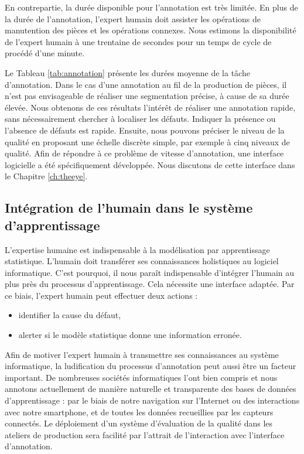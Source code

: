 En contrepartie, la durée disponible pour l'annotation est très limitée. En plus de la durée de l'annotation, l'expert humain doit assister les opérations de manutention des pièces et les opérations connexes.
Nous estimons la disponibilité de l'expert humain à une trentaine de secondes pour un temps de cycle de procédé d'une minute.

Le Tableau \ref{tab:annotation} présente les durées moyenne de la tâche d'annotation.
Dans le cas d'une annotation au fil de la production de pièces, il n'est pas envisageable de réaliser une segmentation précise, à cause de sa durée élevée.
Nous obtenons de ces résultats l'intérêt de réaliser une annotation rapide, sans nécessairement chercher à localiser les défauts.
Indiquer la présence ou l'absence de défauts est rapide.
Ensuite, nous pouvons préciser le niveau de la qualité en proposant une échelle discrète simple, par exemple à cinq niveaux de qualité.
Afin de répondre à ce problème de vitesse d'annotation, une interface logicielle a été spécifiquement développée.
Nous discutons de cette interface dans le Chapitre \ref{ch:theeye}.

\subsection{Intégration de l'humain dans le système d'apprentissage}
L'expertise humaine est indispensable à la modélisation par apprentissage statistique.
L'humain doit transférer ses connaissances holistiques au logiciel informatique.
C'est pourquoi, il nous paraît indispensable d'intégrer l'humain au plus près du processus d'apprentissage.
Cela nécessite une interface adaptée.
Par ce biais, l'expert humain peut effectuer deux actions :
\begin{itemize}
    \item identifier la cause du défaut,
    \item alerter si le modèle statistique donne une information erronée.
\end{itemize}

Afin de motiver l'expert humain à transmettre ses connaissances au système informatique, la ludification du processus d'annotation peut aussi être un facteur important.
De nombreuses sociétés informatiques l'ont bien compris et nous annotons actuellement de manière naturelle et transparente des bases de données d'apprentissage : par le biais de notre navigation sur l'Internet ou des interactions avec notre smartphone, et de toutes les données recueillies par les capteurs connectés.
Le déploiement d'un système d'évaluation de la qualité dans les ateliers de production sera facilité par l'attrait de l'interaction avec l'interface d'annotation.

